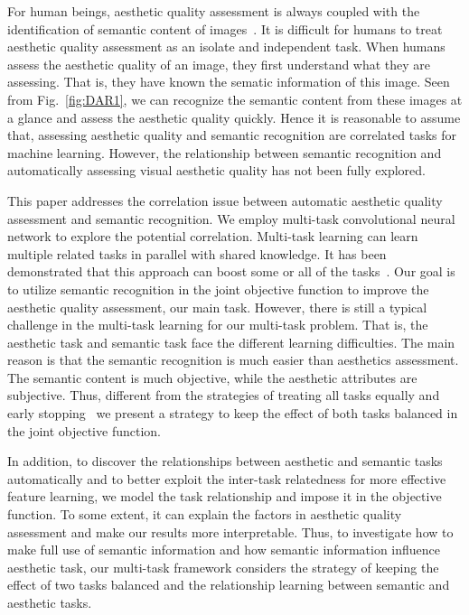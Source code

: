 \documentclass[journal]{IEEEtran}
\begin{document}
For human beings, aesthetic quality assessment is always coupled with the identification of semantic content of images~\cite{mullin2015there,locher2015aesthetic}. It is difficult for humans to treat aesthetic quality assessment as an isolate and independent task. When humans assess the aesthetic quality of an image, they first understand what they are assessing. That is, they have known the sematic information of this image. Seen from Fig.~\ref{fig:DAR1}, we can recognize the semantic content from these images at a glance and assess the aesthetic quality quickly. Hence it is reasonable to assume that, assessing aesthetic quality and semantic recognition are correlated tasks for machine learning. However, the relationship between semantic recognition and automatically assessing visual aesthetic quality has not been fully explored.

This paper addresses the correlation issue between automatic aesthetic quality assessment and semantic recognition. We employ multi-task convolutional neural network to explore the potential correlation. Multi-task learning can learn multiple related tasks in parallel with shared knowledge. It has been demonstrated that this approach can boost some or all of the tasks~\cite{caruana1997}. Our goal is to utilize semantic recognition in the joint objective function to improve the aesthetic quality assessment, our main task. However, there is still a typical challenge in the multi-task learning for our multi-task problem. That is, the aesthetic task and semantic task face the different learning difficulties. The main reason is that the semantic recognition is much easier than aesthetics assessment. The semantic content is much objective, while the aesthetic attributes are subjective. Thus, different from the strategies of treating all tasks equally and early stopping~\cite{caruana1997,jung2015rotating,zhang2014facial} we present a strategy to keep the effect of both tasks balanced in the joint objective function.

In addition, to discover the relationships between aesthetic and semantic tasks automatically and to better exploit the inter-task relatedness for more effective feature learning, we model the task relationship and impose it in the objective function. To some extent, it can explain the factors in aesthetic quality assessment and make our results more interpretable. Thus, to investigate how to make full use of semantic information and how semantic information influence aesthetic task, our multi-task framework considers the strategy of keeping the effect of two tasks balanced and the relationship learning between semantic and aesthetic tasks.
\end{document}
